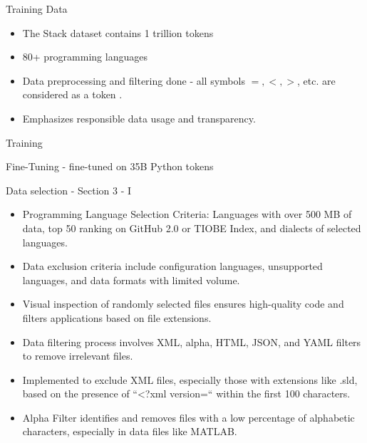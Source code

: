 \begin{frame}{Training Data}
  \begin{itemize}
    \item The Stack dataset contains 1 trillion tokens
    \item 80+ programming languages
       \item Data preprocessing and filtering done - all symbols $=, <, >$, etc. are considered as a token .
    \item Emphasizes responsible data usage and transparency.
  \end{itemize}
\end{frame}
\begin{frame}{Training}
\item Fine-Tuning -  fine-tuned on 35B Python tokens
\end{frame}

\begin{frame}{Data selection - Section 3 - I}
\begin{itemize}
\item Programming Language Selection Criteria: Languages with over 500 MB of data, top 50 ranking on GitHub 2.0 or TIOBE Index, and dialects of selected languages.
\item Data exclusion criteria include configuration languages, unsupported languages, and data formats with limited volume.
\item Visual inspection of randomly selected files ensures high-quality code and filters applications based on file extensions.
\item Data filtering process involves XML, alpha, HTML, JSON, and YAML filters to remove irrelevant files.
\item Implemented to exclude XML files, especially those with extensions like .sld, based on the presence of “<?xml version=“ within the first 100 characters.
\item Alpha Filter identifies and removes files with a low percentage of alphabetic characters, especially in data files like MATLAB.

\end{itemize}
\end{frame}

